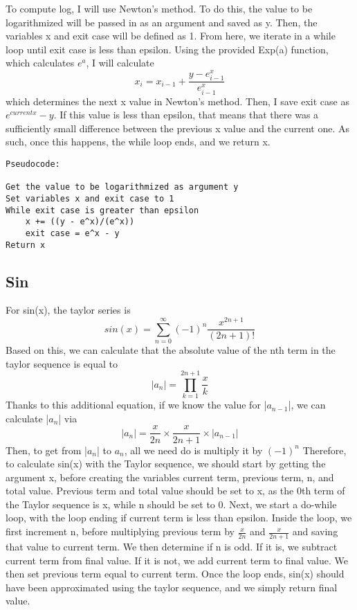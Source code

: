 \documentclass[11pt]{article}
\begin{document}
To compute log, I will use Newton's method. To do this, the value to be logarithmized will be passed in as an argument and saved as y. Then, the variables x and exit case will be defined as 1. From here, we iterate in a while loop until exit case is less than epsilon. Using the provided Exp(a) function, which calculates $e^a$, I will calculate
\[
x_i = x_{i-1} + \frac {y - {e^x_{i-1}}} {e^x_{i-1}}
\]
which determines the next x value in Newton's method. Then, I save exit case as $e^{current x} - y$. If this value is less than epsilon, that means that there was a sufficiently small difference between the previous x value and the current one. As such, once this happens, the while loop ends, and we return x.

\begin{verbatim}
Pseudocode:

Get the value to be logarithmized as argument y
Set variables x and exit case to 1
While exit case is greater than epsilon
    x += ((y - e^x)/(e^x))
    exit case = e^x - y
Return x
\end{verbatim}

\subsection{Sin}

For sin(x), the taylor series is
\[
sin(x) = \sum_{n=0}^{\infty} (-1)^n \frac {x^{2n+1}} {(2n+1)!}
\]
Based on this, we can calculate that the absolute value of the nth term in the taylor sequence is equal to
\[
|a_n| = \prod_{k=1}^{2n+1} \frac x k
\]
Thanks to this additional equation, if we know the value for |$a_{n-1}$|, we can calculate |$a_n$| via
\[
|a_n| = \frac x {2n} \times \frac x {2n+1} \times |a_{n-1}|
\]
Then, to get from |$a_n$| to $a_n$, all we need do is multiply it by $(-1)^n$
Therefore, to calculate sin(x) with the Taylor sequence, we should start by getting the argument x, before creating the variables current term, previous term, n, and total value. Previous term and total value should be set to x, as the 0th term of the Taylor sequence is x, while n should be set to 0. Next, we start a do-while loop, with the loop ending if current term is less than epsilon. Inside the loop, we first increment n, before multiplying previous term by $\frac x {2n}$ and $\frac x {2n+1}$ and saving that value to current term. We then determine if n is odd. If it is, we subtract current term from final value. If it is not, we add current term to final value. We then set previous term equal to current term. Once the loop ends, sin(x) should have been approximated using the taylor sequence, and we simply return final value.
\end{document}
